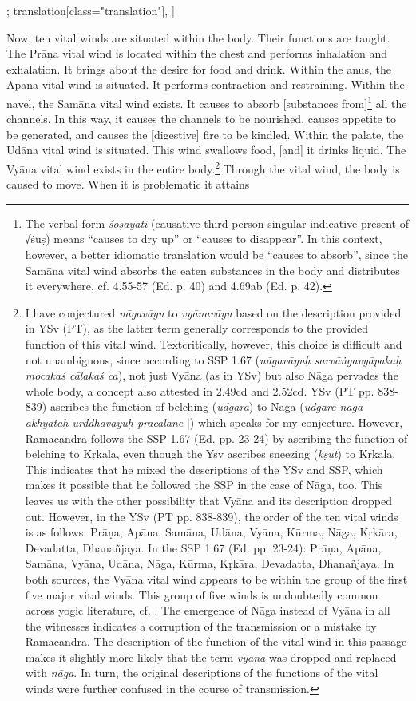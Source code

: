\begin{alignment}[
  texts=edition[class="edition"];
  translation[class="translation"],
  ]
\begin{translation}
\begin{tlate}[p26_01]
  Now, ten vital winds are situated within the body. Their functions are taught. The Prāṇa vital wind is located within the chest and performs inhalation and exhalation. It brings about the desire for food and drink. Within the anus, the Apāna vital wind is situated. It performs contraction and restraining. Within the navel, the Samāna vital wind exists. It causes to absorb [substances from]\footnote{The verbal form \textit{śoṣayati} (causative third person singular indicative present of √śuṣ) means ``causes to dry up'' or ``causes to disappear''. In this context, however, a better idiomatic translation would be ``causes to absorb'', since the Samāna vital wind absorbs the eaten substances in the body and distributes it everywhere, cf.  4.55-57 (Ed. p. 40) and 4.69ab (Ed. p. 42).} all the channels. In this way, it causes the channels to be nourished, causes appetite to be generated, and causes the [digestive] fire to be kindled. Within the palate, the Udāna vital wind is situated. This wind swallows food, [and] it drinks liquid. The Vyāna vital wind exists in the entire body.\footnote{I have conjectured \textit{nāgavāyu} to \textit{vyānavāyu} based on the description provided in YSv (PT), as the latter term generally corresponds to the provided function of this vital wind. Textcritically, however, this choice is difficult and not unambiguous, since according to SSP 1.67 (\textit{nāgavāyuḥ sarvāṅgavyāpakaḥ mocakaś cālakaś ca}), not just Vyāna (as in YSv) but also Nāga pervades the whole body, a concept also attested in  2.49cd and 2.52cd. YSv (PT pp. 838-839) ascribes the function of belching (\textit{udgāra}) to Nāga (\textit{udgāre nāga ākhyātaḥ ūrddhavāyuḥ pracālane} |) which speaks for my conjecture. However, Rāmacandra follows the SSP 1.67 (Ed. pp. 23-24) by ascribing the function of belching to Kṛkala, even though the Ysv ascribes sneezing (\textit{kṣut}) to Kṛkala. This indicates that he mixed the descriptions of the YSv and SSP, which makes it possible that he followed the SSP in the case of Nāga, too. This leaves us with the other possibility that Vyāna and its description dropped out. However, in the YSv (PT pp. 838-839), the order of the ten vital winds is as follows: Prāṇa, Apāna, Samāna, Udāna, Vyāna, Kūrma, Nāga, Kṛkāra, Devadatta, Dhanañjaya. In the SSP 1.67 (Ed. pp. 23-24): Prāṇa, Apāna, Samāna, Vyāna, Udāna, Nāga, Kūrma, Kṛkāra, Devadatta, Dhanañjaya. In both sources, the Vyāna vital wind appears to be within the group of the first five major vital winds. This group of five winds is undoubtedly common across yogic literature, cf. \citeauthor[2017: 187-198]{rootsofyoga2017}. The emergence of Nāga instead of Vyāna in all the witnesses indicates a corruption of the transmission or a mistake by Rāmacandra. The description of the function of the vital wind in this passage makes it slightly more likely that the term \textit{vyāna} was dropped and replaced with \textit{nāga}. In turn, the original descriptions of the functions of the vital winds were further confused in the course of transmission.} Through the vital wind, the body is caused to move. When it is problematic it attains 
\end{tlate}
\end{translation}
\end{alignment}
